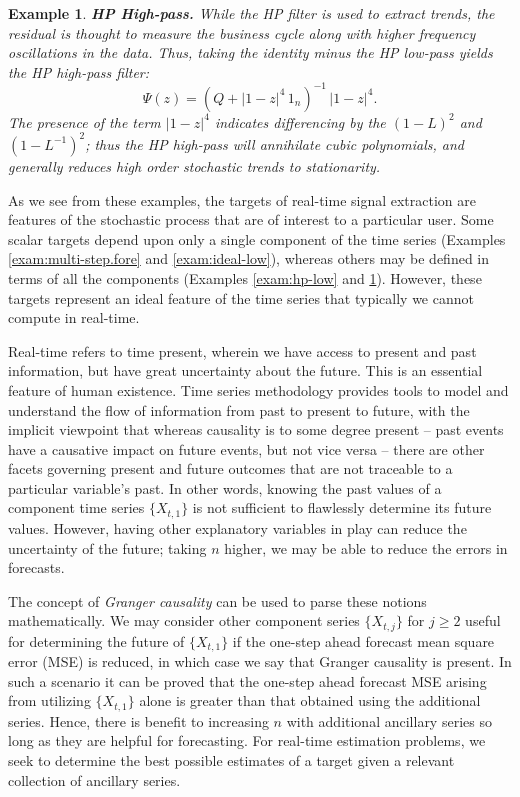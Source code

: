 \documentclass[a4paper]{book}
\newtheorem{Example}{Example}
\begin{document}
\begin{Example} {\bf HP High-pass.} \rm
\label{exam:hp-high}
 While the HP filter is used to extract
 trends, the residual is thought to measure the business cycle along with
 higher frequency oscillations in the data.  Thus, taking the identity minus the
 HP low-pass yields the HP high-pass filter:
\[
  \Psi (z) =   { \left( Q + {| 1 - z|}^4 \, 1_n \right) }^{-1} \, {|1 - z|}^4.
\]
  The presence of the term ${|1 - z|}^4$ indicates differencing by the ${(1-L)}^2$
 and ${(1 - L^{-1})}^2$; thus the HP high-pass will annihilate cubic polynomials,
 and generally reduces high order stochastic trends to stationarity.  
\end{Example}


As we see from these examples, the targets of real-time signal 
 extraction  are features of the stochastic process that are of interest to 
 a particular user.  Some scalar targets depend upon only  a single component 
 of the time series (Examples \ref{exam:multi-step.fore} and \ref{exam:ideal-low}), 
whereas others may be defined in
 terms of all the components (Examples \ref{exam:hp-low} and \ref{exam:hp-high}). 
 However, these targets
 represent an ideal feature of the time series that typically we cannot compute
 in real-time.

 Real-time refers to time present, wherein we have access to present and past 
 information, but have great uncertainty about the future.  This is an 
 essential feature of human existence.  Time series methodology provides tools
 to model and understand the flow of information from past to present to future,
 with the implicit viewpoint that whereas causality is to some degree present --
 past events have  a causative impact on future events, but not vice versa --
 there are other facets governing present and future outcomes that are not 
 traceable to a particular variable's past.  In other words, knowing the past
 values of a component time series $\{ X_{t,1} \}$ is not sufficient to flawlessly
 determine its future values.  However, having other explanatory variables in play
 can reduce the uncertainty of the future; taking $n$ higher, we may be able
 to reduce the errors in forecasts.  

 The concept of {\em Granger causality} can be used to parse these notions mathematically.
 We may consider other component series $\{ X_{t,j} \}$ for $j \geq 2$ useful
 for determining the future of $\{ X_{t,1} \}$ if the one-step ahead forecast
 mean square error (MSE) is reduced, in which case we say that Granger causality
 is present.  In such a scenario it can be proved that the one-step ahead forecast
 MSE arising from utilizing $\{ X_{t,1} \}$ alone is greater than that obtained
 using the additional series.  Hence, there is benefit to increasing $n$ with 
 additional ancillary series so long as they are helpful for forecasting.  For real-time
 estimation problems, we seek to determine the best possible estimates of a
 target given a relevant collection of ancillary series.
\end{document}
